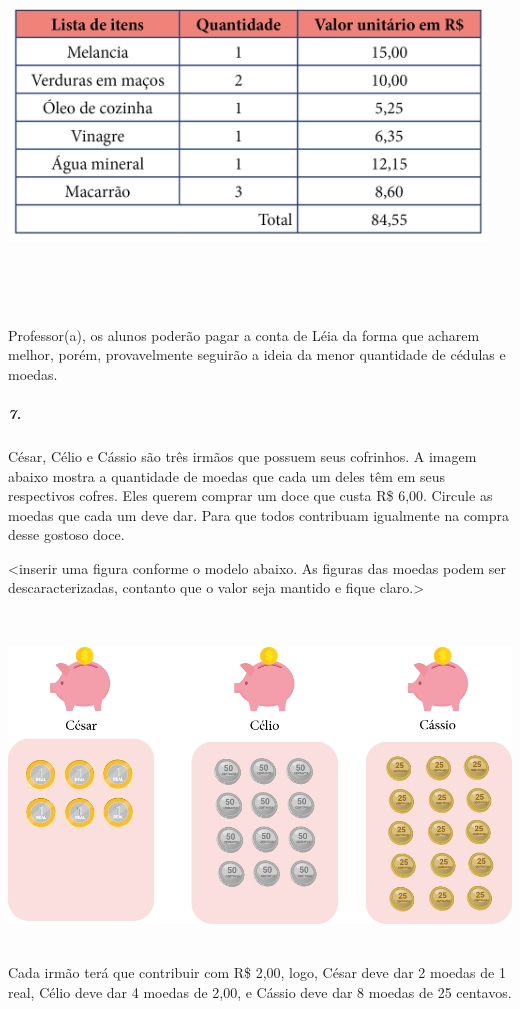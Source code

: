 \includegraphics[width=5.00000in,height=3.80208in]{media/image75.png}

Professor(a), os alunos poderão pagar a conta de Léia da forma que
acharem melhor, porém, provavelmente seguirão a ideia da menor
quantidade de cédulas e moedas.

\subparagraph{7.}\label{section-63}

César, Célio e Cássio são três irmãos que possuem seus cofrinhos. A
imagem abaixo mostra a quantidade de moedas que cada um deles têm em
seus respectivos cofres. Eles querem comprar um doce que custa R\$ 6,00.
Circule as moedas que cada um deve dar. Para que todos contribuam
igualmente na compra desse gostoso doce.

\textless{}inserir uma figura conforme o modelo abaixo. As figuras das
moedas podem ser descaracterizadas, contanto que o valor seja mantido e
fique claro.\textgreater{}

\includegraphics[width=6.14583in,height=3.61068in]{media/image76.png}
Cada irmão terá que contribuir com R\$ 2,00, logo, César deve dar 2
moedas de 1 real, Célio deve dar 4 moedas de 2,00, e Cássio deve dar 8
moedas de 25 centavos.

